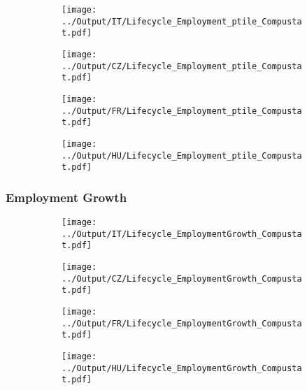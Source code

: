 \documentclass[12pt,notitlepage]{article}
\begin{document}
\begin{figure}[!htpb]
\centering
\caption{Employment (Percentile)}
\begin{subfigure}{.49\textwidth}
    \centering
 \texttt{[image: ../Output/IT/Lifecycle\_Employment\_ptile\_Compustat.pdf]}
\end{subfigure}%
\begin{subfigure}{.49\textwidth}
    \centering
 \texttt{[image: ../Output/CZ/Lifecycle\_Employment\_ptile\_Compustat.pdf]}
\end{subfigure}
\begin{subfigure}{.49\textwidth}
    \centering
 \texttt{[image: ../Output/FR/Lifecycle\_Employment\_ptile\_Compustat.pdf]}
\end{subfigure}%
\begin{subfigure}{.49\textwidth}
    \centering
 \texttt{[image: ../Output/HU/Lifecycle\_Employment\_ptile\_Compustat.pdf]}
\end{subfigure}
\end{figure}
\pagebreak

\subsubsection{Employment Growth}
\begin{figure}[!htpb]
\centering
\caption{Employment (Average)}
\begin{subfigure}{.49\textwidth}
    \centering
 \texttt{[image: ../Output/IT/Lifecycle\_EmploymentGrowth\_Compustat.pdf]}
\end{subfigure}%
\begin{subfigure}{.49\textwidth}
    \centering
 \texttt{[image: ../Output/CZ/Lifecycle\_EmploymentGrowth\_Compustat.pdf]}
\end{subfigure}
\begin{subfigure}{.49\textwidth}
    \centering
 \texttt{[image: ../Output/FR/Lifecycle\_EmploymentGrowth\_Compustat.pdf]}
\end{subfigure}%
\begin{subfigure}{.49\textwidth}
    \centering
 \texttt{[image: ../Output/HU/Lifecycle\_EmploymentGrowth\_Compustat.pdf]}
\end{subfigure}
\end{figure}
\pagebreak
\end{document}
